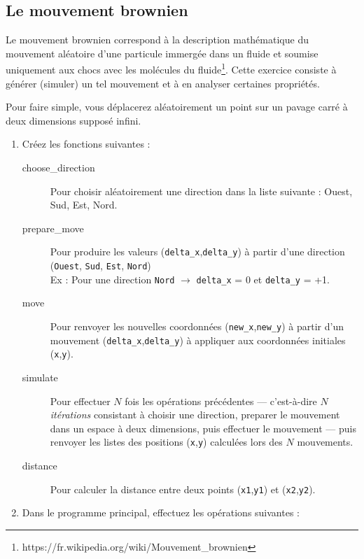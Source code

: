 \subsection{Le mouvement brownien}

Le  mouvement brownien  correspond  à la  description mathématique  du
mouvement  aléatoire d'une  particule immergée  dans un  fluide et soumise
uniquement      aux     chocs      avec      les     molécules      du
fluide\footnote{https://fr.wikipedia.org/wiki/Mouvement\_brownien}.
Cette exercice consiste à générer (simuler) un tel mouvement et à en
analyser certaines propriétés.


Pour  faire simple,  vous déplacerez  aléatoirement un  point
sur un pavage carré à deux dimensions supposé infini.


\begin{enumerate}
\item Créez les fonctions suivantes :
  \begin{description}
  \item[choose\_direction]  Pour choisir  aléatoirement une  direction
    dans la liste suivante : Ouest, Sud, Est, Nord.
  \item[prepare\_move]     Pour      produire     les     valeurs
    (\texttt{delta\_x},\texttt{delta\_y})  à partir  d'une direction
    (\texttt{Ouest}, \texttt{Sud},  \texttt{Est},
    \texttt{Nord})\\ Ex : Pour une direction \texttt{Nord} $\rightarrow$ \texttt{delta\_x} = 0 et
    \texttt{delta\_y} = +1.
  \item[move] Pour renvoyer  les nouvelles coordonnées
    (\texttt{new\_x},\texttt{new\_y})
    à partir  d'un mouvement (\texttt{delta\_x},\texttt{delta\_y})
     à  appliquer aux
    coordonnées initiales (\texttt{x},\texttt{y}).
  \item[simulate]  Pour effectuer  $N$ fois  les opérations  précédentes ---
    c'est-à-dire $N$ \emph{itérations}  consistant à choisir  une
    direction, preparer le mouvement dans  un espace à deux dimensions,
    puis  effectuer  le  mouvement ---  puis  renvoyer  les  listes  des
    positions (\texttt{x},\texttt{y}) calculées lors des $N$ mouvements.
  \item[distance] Pour calculer la  distance entre deux points
    (\texttt{x1},\texttt{y1})
    et (\texttt{x2},\texttt{y2}).
  \end{description}
\item Dans le programme  principal, effectuez les opérations suivantes
  :
  \begin{itemize}

\end{itemize}
\end{enumerate}
